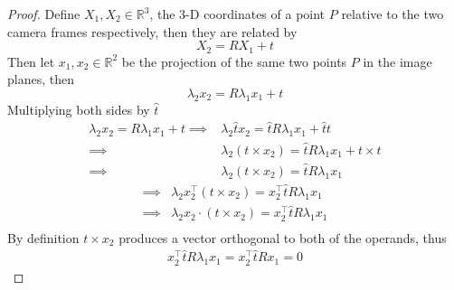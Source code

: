\documentclass{article}
\begin{document}
\begin{proof}
Define $X_1, X_2 \in \mathbb{R}^3$, the 3-D coordinates of a point $P$ relative to the two camera frames respectively, then they are related by
$$X_2 = RX_1+t$$ 
Then let $x_1, x_2 \in \mathbb{R}^2$ be the projection of the same two points $P$ in the image planes, then
$$\lambda_2 x_2 = R\lambda_1x_1+t$$ 
Multiplying both sides by $\hat{t}$
\begin{align*}
\lambda_2 x_2 = R\lambda_1x_1+t \implies &\lambda_2 \hat{t} x_2 = \hat{t}R\lambda_1x_1+\hat{t}t\\
\implies&\lambda_2 (t \times x_2) = \hat{t}R\lambda_1x_1+t\times t\\ 
\implies& \lambda_2 (t \times x_2) = \hat{t}R\lambda_1x_1
\end{align*}
\begin{align*}
\implies& \lambda_2 x_2^\top(t \times x_2) = x_2^\top\hat{t}R\lambda_1x_1\\
\implies& \lambda_2 x_2\cdot(t \times x_2) = x_2^\top\hat{t}R\lambda_1x_1\\
\end{align*}
By definition $t \times x_2$ produces a vector orthogonal to both of the operands, thus
\begin{align*}
x_2^\top\hat{t}R\lambda_1x_1 = x_2^\top\hat{t}Rx_1 = 0
\end{align*}
\end{proof}
\end{document}
